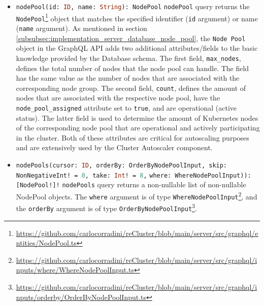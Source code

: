 \begin{itemize}
  \item \lstinline[language=graphql, morekeywords={[2]{NodePool}}, morekeywords={[4]{id, name}},
    morekeywords={[5]{nodePool}}]{nodePool(id: ID, name: String): NodePool}
    \newline
    \texttt{nodePool} query returns the \texttt{NodePool}\footnote{\url{https://github.com/carlocorradini/reCluster/blob/main/server/src/graphql/entities/NodePool.ts}}
    object that matches the specified identifier (\texttt{id} argument) or name (\texttt{name}
    argument).
    \newline
    As mentioned in section \ref{subsubsec:implementation_server_database_node_pool},
    the \texttt{Node Pool} object in the GraphQL API adds two additional attributes/fields
    to the basic knowledge provided by the Database schema. The first field, \texttt{max\_nodes},
    defines the total number of nodes that the node pool can handle. The field
    has the same value as the number of nodes that are associated with the
    corresponding node group. The second field, \texttt{count}, defines the
    amount of nodes that are associated with the respective node pool, have the \texttt{node\_pool\_assigned}
    attribute set to \texttt{true}, and are operational (active status). The latter
    field is used to determine the amount of Kubernetes nodes of the corresponding
    node pool that are operational and actively participating in the cluster.
    Both of these attributes are critical for autoscaling purposes and are
    extensively used by the Cluster Autoscaler component.

  \item \lstinline[language=graphql, morekeywords={[2]{NodePool, OrderByNodePoolInput, NonNegativeInt, WhereNodePoolInput}},
    morekeywords={[4]{cursor, orderBy, skip, take, where}}, morekeywords={[5]{nodePools}}]{nodePools(cursor: ID, orderBy: OrderByNodePoolInput, skip: NonNegativeInt! = 0, take: Int! = 8,}
    \newline
    \hphantom{----------------}\lstinline[language=graphql, morekeywords={[2]{NodePool, OrderByNodePoolInput, NonNegativeInt, WhereNodePoolInput}},
    morekeywords={[4]{cursor, orderBy, skip, take, where}}, morekeywords={[5]{nodePools}}]{where: WhereNodePoolInput)): [NodePool!]!}
    \newline
    \texttt{nodePools} query returns a non-nullable list of non-nullable NodePool
    objects.
    \newline
    The \texttt{where} argument is of type \texttt{WhereNodePoolInput}\footnote{\url{https://github.com/carlocorradini/reCluster/blob/main/server/src/graphql/inputs/where/WhereNodePoolInput.ts}},
    and the \texttt{orderBy} argument is of type \texttt{OrderByNodePoolInput}\footnote{\url{https://github.com/carlocorradini/reCluster/blob/main/server/src/graphql/inputs/orderby/OrderByNodePoolInput.ts}}.


\end{itemize}
